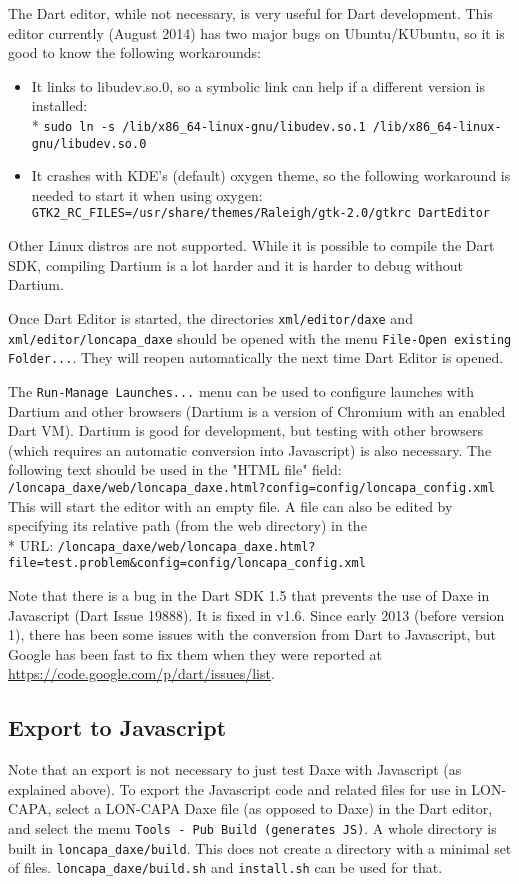 The Dart editor, while not necessary, is very useful for Dart development. This editor currently (August 2014) has two major bugs on Ubuntu/KUbuntu, so it is good to know the following workarounds:
\begin{itemize}
\item It links to libudev.so.0, so a symbolic link can help if a different version is installed: \\*
  \texttt{sudo ln -s /lib/x86\_64-linux-gnu/libudev.so.1 /lib/x86\_64-linux-gnu/libudev.so.0}
\item It crashes with KDE's (default) oxygen theme, so the following workaround is needed to start it when using oxygen:
  \texttt{GTK2\_RC\_FILES=/usr/share/themes/Raleigh/gtk-2.0/gtkrc DartEditor}
\end{itemize}

Other Linux distros are not supported. While it is possible to compile the Dart SDK, compiling Dartium is a lot harder and it is harder to debug without Dartium.

Once Dart Editor is started, the directories \texttt{xml/editor/daxe} and \texttt{xml/editor/loncapa\_daxe} should be opened with the menu \texttt{File-Open existing Folder...}. They will reopen automatically the next time Dart Editor is opened.

The \texttt{Run-Manage Launches...} menu can be used to configure launches with Dartium and other browsers (Dartium is a version of Chromium with an enabled Dart VM). Dartium is good for development, but testing with other browsers (which requires an automatic conversion into Javascript) is also necessary.
The following text should be used in the "HTML file" field:
\texttt{/loncapa\_daxe/web/loncapa\_daxe.html?config=config/loncapa\_config.xml}
This will start the editor with an empty file. A file can also be edited by specifying its relative path (from the web directory) in the \\*
URL: \texttt{/loncapa\_daxe/web/loncapa\_daxe.html?file=test.problem\&config=config/loncapa\_config.xml}

Note that there is a bug in the Dart SDK 1.5 that prevents the use of Daxe in Javascript (Dart Issue 19888). It is fixed in v1.6. Since early 2013 (before version 1), there has been some issues with the conversion from Dart to Javascript, but Google has been fast to fix them when they were reported at \url{https://code.google.com/p/dart/issues/list}.

\subsection{Export to Javascript}

Note that an export is not necessary to just test Daxe with Javascript (as explained above).
To export the Javascript code and related files for use in LON-CAPA, select a LON-CAPA Daxe file (as opposed to Daxe) in the Dart editor,
and select the menu \texttt{Tools - Pub Build (generates JS)}. A whole directory is built in \texttt{loncapa\_daxe/build}.
This does not create a directory with a minimal set of files. \texttt{loncapa\_daxe/build.sh} and \texttt{install.sh} can be used for that.
